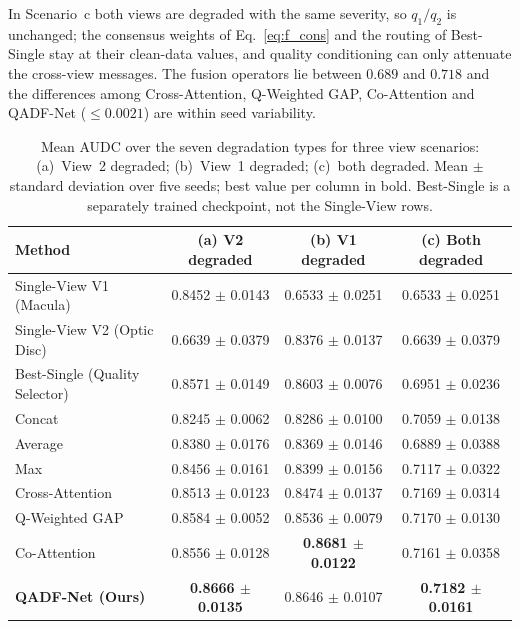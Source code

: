 \documentclass[final,5p,times,twocolumn,authoryear]{elsarticle}
\newcommand{\qadfnet}{QADF-Net}
\theoremstyle{plain}
\theoremstyle{remark}
\begin{document}
In Scenario~c both views are degraded with the same severity, so $q_1/q_2$ is unchanged; the consensus weights of Eq.~\eqref{eq:f_cons} and the routing of Best-Single stay at their clean-data values, and quality conditioning can only attenuate the cross-view messages. The fusion operators lie between $0.689$ and $0.718$ and the differences among Cross-Attention, Q-Weighted GAP, Co-Attention and \qadfnet{} ($\le0.0021$) are within seed variability.

\begin{table}[!tb]
\centering
\renewcommand{\arraystretch}{0.7}
\caption{Mean AUDC over the seven degradation types for three view scenarios: (a)~View~2 degraded; (b)~View~1 degraded; (c)~both degraded. Mean $\pm$ standard deviation over five seeds; best value per column in bold. Best-Single is a separately trained checkpoint, not the Single-View rows.}
\label{tab:degrad_scenarios}
\footnotesize
\begin{tabular}{lccc}
\toprule
Method & (a) V2 degraded & (b) V1 degraded & (c) Both degraded \\
\midrule
Single-View V1 (Macula)       & 0.8452 $\pm$ 0.0143 & 0.6533 $\pm$ 0.0251 & 0.6533 $\pm$ 0.0251 \\
Single-View V2 (Optic Disc)   & 0.6639 $\pm$ 0.0379 & 0.8376 $\pm$ 0.0137 & 0.6639 $\pm$ 0.0379 \\
Best-Single (Quality Selector)& 0.8571 $\pm$ 0.0149 & 0.8603 $\pm$ 0.0076 & 0.6951 $\pm$ 0.0236 \\
Concat                        & 0.8245 $\pm$ 0.0062 & 0.8286 $\pm$ 0.0100 & 0.7059 $\pm$ 0.0138 \\
Average                       & 0.8380 $\pm$ 0.0176 & 0.8369 $\pm$ 0.0146 & 0.6889 $\pm$ 0.0388 \\
Max                           & 0.8456 $\pm$ 0.0161 & 0.8399 $\pm$ 0.0156 & 0.7117 $\pm$ 0.0322 \\
Cross-Attention               & 0.8513 $\pm$ 0.0123 & 0.8474 $\pm$ 0.0137 & 0.7169 $\pm$ 0.0314 \\
Q-Weighted GAP                & 0.8584 $\pm$ 0.0052 & 0.8536 $\pm$ 0.0079 & 0.7170 $\pm$ 0.0130 \\
Co-Attention                  & 0.8556 $\pm$ 0.0128 & \textbf{0.8681 $\pm$ 0.0122} & 0.7161 $\pm$ 0.0358 \\
\midrule
\textbf{\qadfnet{} (Ours)}    & \textbf{0.8666 $\pm$ 0.0135} & 0.8646 $\pm$ 0.0107 & \textbf{0.7182 $\pm$ 0.0161} \\
\bottomrule
\end{tabular}
\end{table}
\end{document}
